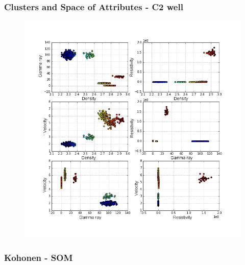 \documentclass[aspectratio=10]{beamer} %
\begin{document}
\begin{frame}
\frametitle{Clusters and Space of Attributes - C2 well}

\begin{figure}
	\includegraphics[scale=0.29]{Imagens/cluterpocoC2.png}
\end{figure}

\end{frame}

\subsubsection{Kohonen - SOM}
\end{document}
